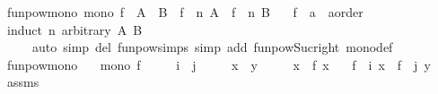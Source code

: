 \begin{isabellebody}
\ funpow{\isacharunderscore}{\kern0pt}mono{\isacharcolon}{\kern0pt}\ {\isachardoublequoteopen}mono\ f\ {\isasymLongrightarrow}\ A\ {\isasymle}\ B\ {\isasymLongrightarrow}\ {\isacharparenleft}{\kern0pt}f\ {\isacharcircum}{\kern0pt}{\isacharcircum}{\kern0pt}\ n{\isacharparenright}{\kern0pt}\ A\ {\isasymle}\ {\isacharparenleft}{\kern0pt}f\ {\isacharcircum}{\kern0pt}{\isacharcircum}{\kern0pt}\ n{\isacharparenright}{\kern0pt}\ B{\isachardoublequoteclose}\isanewline
\ \ \ f\ {\isacharcolon}{\kern0pt}{\isacharcolon}{\kern0pt}\ {\isachardoublequoteopen}{\isacharprime}{\kern0pt}a\ {\isasymRightarrow}\ {\isacharparenleft}{\kern0pt}{\isacharprime}{\kern0pt}a{\isacharcolon}{\kern0pt}{\isacharcolon}{\kern0pt}order{\isacharparenright}{\kern0pt}{\isachardoublequoteclose}\isanewline
%
\isadelimproof
\ \ %
\endisadelimproof
%
\isatagproof
{}\isamarkupfalse%
\ {\isacharparenleft}{\kern0pt}induct\ n\ arbitrary{\isacharcolon}{\kern0pt}\ A\ B{\isacharparenright}{\kern0pt}\isanewline
\ \ \ \ \ {\isacharparenleft}{\kern0pt}auto\ simp\ del{\isacharcolon}{\kern0pt}\ funpow{\isachardot}{\kern0pt}simps{\isacharparenleft}{\kern0pt}{}{\isacharparenright}{\kern0pt}\ simp\ add{\isacharcolon}{\kern0pt}\ funpow{\isacharunderscore}{\kern0pt}Suc{\isacharunderscore}{\kern0pt}right\ mono{\isacharunderscore}{\kern0pt}def{\isacharparenright}{\kern0pt}%
\endisatagproof
{\isafoldproof}%
%
\isadelimproof
\isanewline
%
\endisadelimproof
\isanewline
{}\isamarkupfalse%
\ funpow{\isacharunderscore}{\kern0pt}mono{}{\isacharcolon}{\kern0pt}\isanewline
\ \ \ {\isachardoublequoteopen}mono\ f{\isachardoublequoteclose}\isanewline
\ \ \ \ \ {\isachardoublequoteopen}i\ {\isasymle}\ j{\isachardoublequoteclose}\isanewline
\ \ \ \ \ {\isachardoublequoteopen}x\ {\isasymle}\ y{\isachardoublequoteclose}\isanewline
\ \ \ \ \ {\isachardoublequoteopen}x\ {\isasymle}\ f\ x{\isachardoublequoteclose}\isanewline
\ \ \ {\isachardoublequoteopen}{\isacharparenleft}{\kern0pt}f\ {\isacharcircum}{\kern0pt}{\isacharcircum}{\kern0pt}\ i{\isacharparenright}{\kern0pt}\ x\ {\isasymle}\ {\isacharparenleft}{\kern0pt}f\ {\isacharcircum}{\kern0pt}{\isacharcircum}{\kern0pt}\ j{\isacharparenright}{\kern0pt}\ y{\isachardoublequoteclose}\isanewline
%
\isadelimproof
\ \ %
\endisadelimproof
%
\isatagproof
{}\isamarkupfalse%
\ assms{\isacharparenleft}{\kern0pt}{}{\isacharcomma}{\kern0pt}{}{\isacharparenright}{\kern0pt}\isanewline
{}\isamarkupfalse%

\end{isabellebody}
